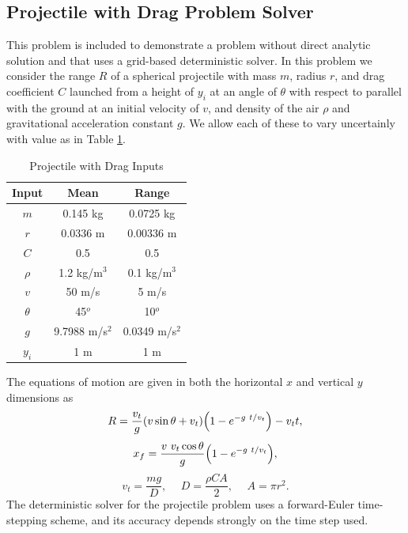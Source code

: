 \documentclass{mc2015}
\begin{document}
\subsection{Projectile with Drag Problem Solver}
This problem is included to demonstrate a problem without direct analytic solution and that uses a grid-based deterministic solver.  In this problem we consider the range $R$ of a spherical projectile with mass $m$, radius $r$, and drag coefficient $C$ launched from a height of $y_i$ at an angle of $\theta$ with respect to parallel with the ground at an initial velocity of $v$, and density of the air $\rho$ and gravitational acceleration constant $g$.  We allow each of these to vary uncertainly with value as in Table \ref{proj init}.
\begin{table}[h]
\centering
\begin{tabular}{c | c c}
Input & Mean & Range \\ \hline
$m$ & 0.145 kg & 0.0725 kg\\
$r$ & 0.0336 m & 0.00336 m \\
$C$ & 0.5 & 0.5 \\
$\rho$ & 1.2 kg/m$^3$ & 0.1 kg/m$^3$\\
$v$ & 50 m/s & 5 m/s \\
$\theta$ & 45$^o$ & 10$^o$ \\
$g$ & 9.7988 m/s$^2$ & 0.0349 m/s$^2$\\
$y_i$ & 1 m & 1 m
\end{tabular}
\caption{Projectile with Drag Inputs}
\label{proj init}
\end{table}

The equations of motion are given in both the horizontal $x$ and vertical $y$ dimensions as
\begin{equation}
R=\frac{v_t}{g}(v\sin\theta+v_t)\qty(1-e^{-g\ t/v_t})-v_tt,
\end{equation}
\begin{equation}
x_f = \frac{v\ v_t\cos\theta}{g}\qty(1-e^{-g\ t/v_t}),
\end{equation}
\begin{equation}
v_t = \frac{mg}{D},\hspace{15pt}D=\frac{\rho C A}{2},\hspace{15pt}A=\pi r^2.
\end{equation}
The deterministic solver for the projectile problem uses a forward-Euler time-stepping scheme, and its accuracy depends strongly on the time step used.
\end{document}
